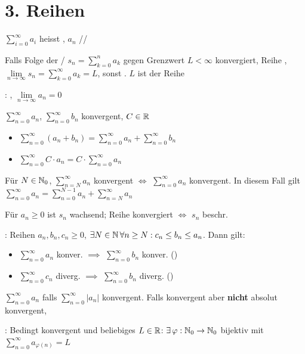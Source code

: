 \section{3. Reihen}

\Def $\sum_{i=0}^{\infty} a_i$ heisst ,
$a_n$ //

\Def Falls Folge der /
$s_n = \sum_{k=0}^{n} a_k$ gegen Grenzwert $L < \infty$ konvergiert,
Reihe , $\lim\limits_{n\to\infty} s_n = \sum_{k=0}^{\infty} a_k = L$,
sonst . $L$ ist  der Reihe

\Satz {}: , $\lim\limits_{n\to\infty} a_n = 0$

\Satz $\sum_{n=0}^{\infty} a_n$, $\sum_{n=0}^{\infty} b_n$ konvergent, $C \in \mathbb{R}$
\vspace{-0.6em}
\begin{itemize}
    \item $\sum_{n=0}^{\infty} (a_n + b_n) = \sum_{n=0}^{\infty} a_n + \sum_{n=0}^{\infty} b_n$
    \item $\sum_{n=0}^{\infty} C \cdot a_n = C \cdot \sum_{n=0}^{\infty} a_n$
\end{itemize}

\Satz Für $N \in \mathbb{N}_0$, $\sum_{n=N}^{\infty} a_n$ konvergent $\iff$ $\sum_{n=0}^{\infty} a_n$ konvergent.
In diesem Fall gilt $\sum_{n=0}^{\infty} a_n = \sum_{n=0}^{N-1} a_n + \sum_{n=N}^{\infty} a_n$

\Satz Für $a_n\ge 0$ ist $s_n$ wachsend; Reihe konvergiert $\iff$ $s_n$ beschr.

\Satz {}: Reihen $a_n, b_n, c_n\ge 0$,
$\exists N \in \mathbb{N} \, \forall n\ge N : c_n\le b_n\le a_n$. Dann gilt:
\vspace{-0.6em}
\begin{itemize}
    \item $\sum_{n=0}^{\infty} a_n$ konver. $\implies$ $\sum_{n=0}^{\infty} b_n$ konver. ()
    \item $\sum_{n=0}^{\infty} c_n$ diverg. $\implies$ $\sum_{n=0}^{\infty} b_n$ diverg. ()
\end{itemize}

\Def $\sum_{n=0}^{\infty} a_n$  falls $\sum_{n=0}^{\infty} |a_n|$ konvergent.
Falls konvergent aber \textbf{nicht} absolut konvergent, 

\Satz {}: Bedingt konvergent und beliebiges $L \in \mathbb{R}$:
$\exists \, \varphi: \mathbb{N}_0 \to \mathbb{N}_0$ bijektiv mit $\sum_{n=0}^{\infty} a_{\varphi(n)} = L$

